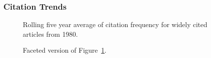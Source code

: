 \documentclass[
  10pt,
  letterpaper,
  DIV=11,
  numbers=noendperiod,
  twoside]{scrartcl}
\begin{document}
\subsubsection*{Citation Trends}\label{sec-trends-1980}

\begin{figure}


\caption{\label{fig-citation-spaghetti-1980}Rolling five year average of
citation frequency for widely cited articles from 1980.}

\end{figure}%

\begin{figure}


\caption{\label{fig-citation-facet-1980}Faceted version of
Figure~\ref{fig-citation-spaghetti-1980}.}

\end{figure}%
\end{document}
